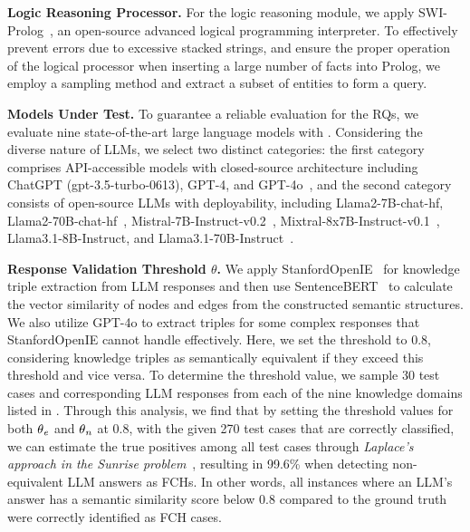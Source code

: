\noindent \textbf{Logic Reasoning Processor.} 
For the logic reasoning module, we apply SWI-Prolog~\cite{wielemaker2012swi}, an open-source advanced logical programming interpreter. To effectively prevent errors due to excessive stacked strings, and ensure the proper operation of the logical processor when inserting a large number of facts into Prolog, we employ a sampling method and extract a subset of entities to form a query. 

\noindent \textbf{Models Under Test.} 
To guarantee a reliable evaluation for the RQs, we evaluate nine state-of-the-art large language models with \tool. Considering the diverse nature of LLMs, we select two distinct categories: the first category comprises API-accessible models with closed-source architecture including ChatGPT (gpt-3.5-turbo-0613), GPT-4, and GPT-4o~\cite{OpenAI2023GPT4TR}, and the second category consists of open-source LLMs with deployability, including Llama2-7B-chat-hf, Llama2-70B-chat-hf~\cite{touvron2023llama}, Mistral-7B-Instruct-v0.2~\cite{jiang2023mistral}, Mixtral-8x7B-Instruct-v0.1~\cite{jiang2024mixtral}, Llama3.1-8B-Instruct, and Llama3.1-70B-Instruct~\cite{llama32024tr}.  

\noindent \textbf{Response Validation Threshold $\theta$.} 
We apply StanfordOpenIE~\cite{angeli-etal-2015-leveraging} for knowledge triple extraction from LLM responses and then use SentenceBERT~\cite{reimers2019sentence} to calculate the vector similarity of nodes and edges from the constructed semantic structures. We also utilize GPT-4o to extract triples for some complex responses that StanfordOpenIE cannot handle effectively. Here, we set the threshold to 0.8, considering knowledge triples as semantically equivalent if they exceed this threshold and vice versa. To determine the threshold value, we sample 30 test cases and corresponding LLM responses from each of the nine knowledge domains listed in . Through this analysis, we find that by setting the threshold values for both $\theta_\mathit{e}$ and $\theta_\mathit{n}$ at 0.8, with the given 270 test cases that are correctly classified, we can estimate the true positives among all test cases through \textit{Laplace's approach in the Sunrise problem}~\cite{laplace1951philosophical}, resulting in 99.6\% when detecting non-equivalent LLM answers as FCHs. In other words, all instances where an LLM's answer has a semantic similarity score below 0.8 compared to the ground truth were correctly identified as FCH cases. 

